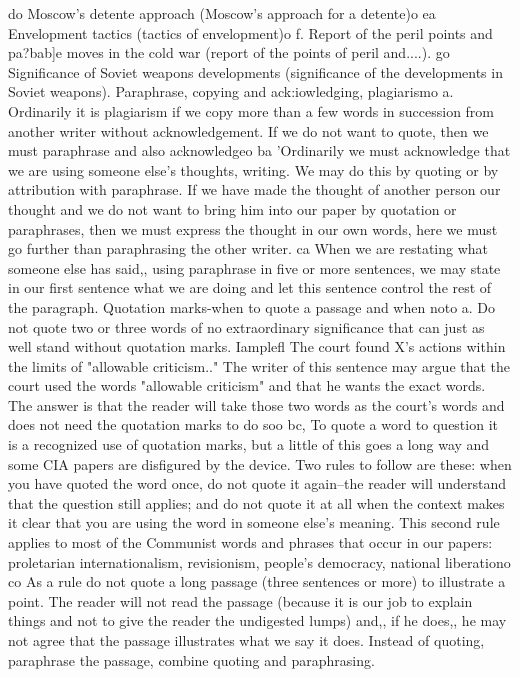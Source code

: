 \documentclass[
    oneside,
    11pt,
    draft
]{memoir}
\begin{document}
do Moscow's detente approach (Moscow's approach for a detente)o ea Envelopment tactics (tactics of envelopment)o f. Report of the peril points and pa?bab]e moves in the cold war (report of the points of peril and....). go Significance of Soviet weapons developments (significance of the developments in Soviet weapons). Paraphrase, copying and ack:iowledging, plagiarismo a. Ordinarily it is plagiarism if we copy more than a few words in succession from another writer without acknowledgement. If we do not want to quote, then we must paraphrase and also acknowledgeo ba 'Ordinarily we must acknowledge that we are using someone else's thoughts, writing. We may do this by quoting or by attribution with paraphrase. If we have made the thought of another person our thought and we do not want to bring him into our paper by quotation or paraphrases, then we must express the thought in our own words, here we must go further than paraphrasing the other writer. ca When we are restating what someone else has said,, using paraphrase in five or more sentences, we may state in our first sentence what we are doing and let this sentence control the rest of the paragraph. Quotation marks-when to quote a passage and when noto a. Do not quote two or three words of no extraordinary significance that can just as well stand without quotation marks. Iamplefl The court found X's actions within the limits of "allowable criticism.." The writer of this sentence may argue that the court used the words "allowable criticism" and that he wants the exact words. The answer is that the reader will take those two words as the court's words and does not need the quotation marks to do soo bc, To quote a word to question it is a recognized use of quotation marks, but a little of this goes a long way and some CIA papers are disfigured by the device. Two rules to follow are these: when you have quoted the word once, do not quote it again--the reader will understand that the question still applies; and do not quote it at all when the context makes it clear that you are using the word in someone else's meaning. This second rule applies to most of the Communist words and phrases that occur in our papers: proletarian internationalism, revisionism, people's democracy, national liberationo co As a rule do not quote a long passage (three sentences or more) to illustrate a point. The reader will not read the passage (because it is our job to explain things and not to give the reader the undigested lumps) and,, if he does,, he may not agree that the passage illustrates what we say it does. Instead of quoting, paraphrase the passage, combine quoting and paraphrasing.
\end{document}
